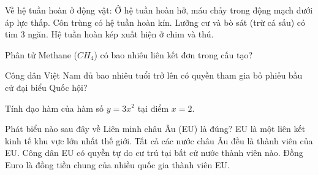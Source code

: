 \begin{ex}
    Về hệ tuần hoàn ở động vật:
    \choiceTF
    {\True Ở hệ tuần hoàn hở, máu chảy trong động mạch dưới áp lực thấp.}
    {Côn trùng có hệ tuần hoàn kín.}
    {\True Lưỡng cư và bò sát (trừ cá sấu) có tim 3 ngăn.}
    {\True Hệ tuần hoàn kép xuất hiện ở chim và thú.}
\end{ex}

\begin{ex}
    Phân tử Methane ($CH_4$) có bao nhiêu liên kết đơn trong cấu tạo?
\end{ex}

\begin{ex}
    Công dân Việt Nam đủ bao nhiêu tuổi trở lên có quyền tham gia bỏ phiếu bầu cử đại biểu Quốc hội?
\end{ex}

\begin{ex}
    Tính đạo hàm của hàm số $y = 3x^2$ tại điểm $x = 2$.
\end{ex}

\begin{ex}
    Phát biểu nào sau đây về Liên minh châu Âu (EU) là đúng?
    \choiceTF
    {\True EU là một liên kết kinh tế khu vực lớn nhất thế giới.}
    {Tất cả các nước châu Âu đều là thành viên của EU.}
    {\True Công dân EU có quyền tự do cư trú tại bất cứ nước thành viên nào.}
    {\True Đồng Euro là đồng tiền chung của nhiều quốc gia thành viên EU.}
\end{ex}

